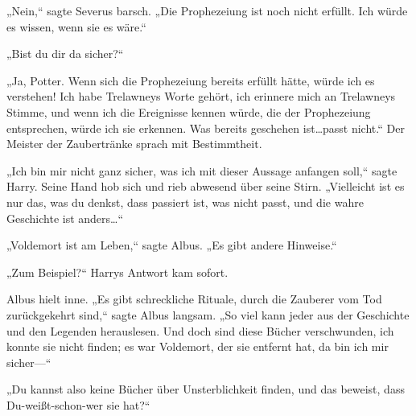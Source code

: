 „Nein,“ sagte Severus barsch. „Die Prophezeiung ist noch nicht erfüllt. Ich würde es wissen, wenn sie es wäre.“

„Bist du dir da sicher?“

„Ja, Potter. Wenn sich die Prophezeiung bereits erfüllt hätte, würde ich es verstehen! Ich habe Trelawneys Worte gehört, ich erinnere mich an Trelawneys Stimme, und wenn ich die Ereignisse kennen würde, die der Prophezeiung entsprechen, würde ich sie erkennen. Was bereits geschehen ist…passt nicht.“ Der Meister der Zaubertränke sprach mit Bestimmtheit.

„Ich bin mir nicht ganz sicher, was ich mit dieser Aussage anfangen soll,“ sagte Harry. Seine Hand hob sich und rieb abwesend über seine Stirn. „Vielleicht ist es nur das, was du denkst, dass passiert ist, was nicht passt, und die wahre Geschichte ist anders…“

„Voldemort ist am Leben,“ sagte Albus. „Es gibt andere Hinweise.“

„Zum Beispiel?“ Harrys Antwort kam sofort.

Albus hielt inne. „Es gibt schreckliche Rituale, durch die Zauberer vom Tod zurückgekehrt sind,“ sagte Albus langsam. „So viel kann jeder aus der Geschichte und den Legenden herauslesen. Und doch sind diese Bücher verschwunden, ich konnte sie nicht finden; es war Voldemort, der sie entfernt hat, da bin ich mir sicher—“

„Du kannst also keine Bücher über Unsterblichkeit finden, und das beweist, dass Du-weißt-schon-wer sie hat?“

